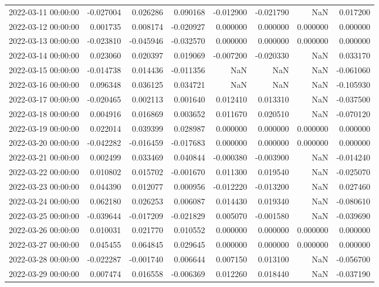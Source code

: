 \begin{tabular}{lrrrrrrr}
2022-03-11 00:00:00 & -0.027004 & 0.026286 & 0.090168 & -0.012900 & -0.021790 & NaN & 0.017200 \\
2022-03-12 00:00:00 & 0.001735 & 0.008174 & -0.020927 & 0.000000 & 0.000000 & 0.000000 & 0.000000 \\
2022-03-13 00:00:00 & -0.023810 & -0.045946 & -0.032570 & 0.000000 & 0.000000 & 0.000000 & 0.000000 \\
2022-03-14 00:00:00 & 0.023060 & 0.020397 & 0.019069 & -0.007200 & -0.020330 & NaN & 0.033170 \\
2022-03-15 00:00:00 & -0.014738 & 0.014436 & -0.011356 & NaN & NaN & NaN & -0.061060 \\
2022-03-16 00:00:00 & 0.096348 & 0.036125 & 0.034721 & NaN & NaN & NaN & -0.105930 \\
2022-03-17 00:00:00 & -0.020465 & 0.002113 & 0.001640 & 0.012410 & 0.013310 & NaN & -0.037500 \\
2022-03-18 00:00:00 & 0.004916 & 0.016869 & 0.003652 & 0.011670 & 0.020510 & NaN & -0.070120 \\
2022-03-19 00:00:00 & 0.022014 & 0.039399 & 0.028987 & 0.000000 & 0.000000 & 0.000000 & 0.000000 \\
2022-03-20 00:00:00 & -0.042282 & -0.016459 & -0.017683 & 0.000000 & 0.000000 & 0.000000 & 0.000000 \\
2022-03-21 00:00:00 & 0.002499 & 0.033469 & 0.040844 & -0.000380 & -0.003900 & NaN & -0.014240 \\
2022-03-22 00:00:00 & 0.010802 & 0.015702 & -0.001670 & 0.011300 & 0.019540 & NaN & -0.025070 \\
2022-03-23 00:00:00 & 0.044390 & 0.012077 & 0.000956 & -0.012220 & -0.013200 & NaN & 0.027460 \\
2022-03-24 00:00:00 & 0.062180 & 0.026253 & 0.006087 & 0.014430 & 0.019340 & NaN & -0.080610 \\
2022-03-25 00:00:00 & -0.039644 & -0.017209 & -0.021829 & 0.005070 & -0.001580 & NaN & -0.039690 \\
2022-03-26 00:00:00 & 0.010031 & 0.021770 & 0.010552 & 0.000000 & 0.000000 & 0.000000 & 0.000000 \\
2022-03-27 00:00:00 & 0.045455 & 0.064845 & 0.029645 & 0.000000 & 0.000000 & 0.000000 & 0.000000 \\
2022-03-28 00:00:00 & -0.022287 & -0.001740 & 0.006644 & 0.007150 & 0.013100 & NaN & -0.056700 \\
2022-03-29 00:00:00 & 0.007474 & 0.016558 & -0.006369 & 0.012260 & 0.018440 & NaN & -0.037190 \\

\end{tabular}
